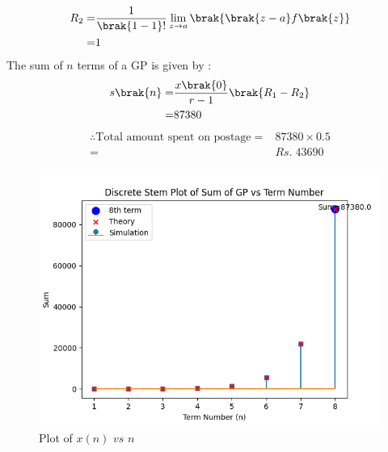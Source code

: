 \documentclass[journal,12pt,twocolumn]{IEEEtran}
\theoremstyle{remark}
\begin{document}
\begin{align}
R_2 =& \frac{1}{\brak{1 - 1}!} \lim_{z \to a} \brak{\brak{z - a}f\brak{z}}\\
	=& 1
\end{align}
The sum of $n$ terms of a GP is given by :
\begin{align}
s\brak{n}=&\dfrac{x\brak{0}}{r-1} \brak{R_1 -R_2}\\
		 =& 87380\\
\end{align}
\begin{align}
\therefore \text{Total amount spent on postage}=& 87380 \times 0.5 \\ 
             =& Rs.\; 43690
\end{align}

\begin{figure}[ht]
	\centering
    \includegraphics[width=\columnwidth]{ncert-maths/11/9/5/29/figs/figure1.png}
    \caption{Plot of $x(n)$ $vs$ $n$}
    \label{fig: 11.9.5.29.2}
\end{figure}
\end{document}
